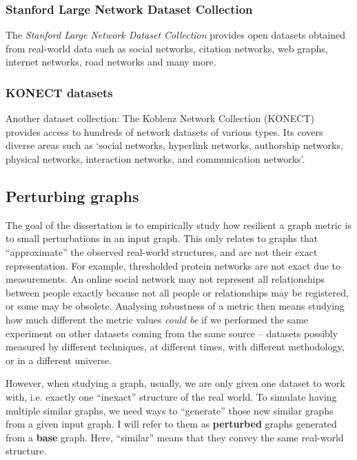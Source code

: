 \subsubsection{Stanford Large Network Dataset Collection}

The \textit{Stanford Large Network Dataset Collection}\cite{Large2016} provides open datasets obtained from real-world data such as social networks, citation networks, web graphs, internet networks, road networks and many more.


\subsubsection{KONECT datasets}

Another dataset collection: The Koblenz Network Collection (KONECT)~\cite{Kunegis2013} provides access to hundreds of network datasets of various types.
Its covers diverse areas such as `social networks, hyperlink networks, authorship networks, physical networks, interaction networks, and communication networks'.


\subsection{Perturbing graphs}\label{sec:perturbing_graphs}

The goal of the dissertation is to empirically study how resilient a graph metric is to small perturbations in an input graph.
This only relates to graphs that ``approximate'' the observed real-world structures, and are not their exact representation.
For example, thresholded protein networks are not exact due to measurements.
An online social network may not represent all relationships between people exactly because not all people or relationships may be registered, or some may be obsolete.
Analysing robustness of a metric then means studying how much different the metric values \textsl{could be} if we performed the same experiment on other datasets coming from the same source -- datasets possibly measured by different techniques, at different times, with different methodology, or in a different universe.

However, when studying a graph, usually, we are only given one dataset to work with, i.e. exactly one ``inexact'' structure of the real world.
To simulate having multiple similar graphs, we need ways to ``generate'' those new similar graphs from a given input graph.
I will refer to them as \textbf{perturbed} graphs generated from a \textbf{base} graph.
Here, ``similar'' means that they convey the same real-world structure.

